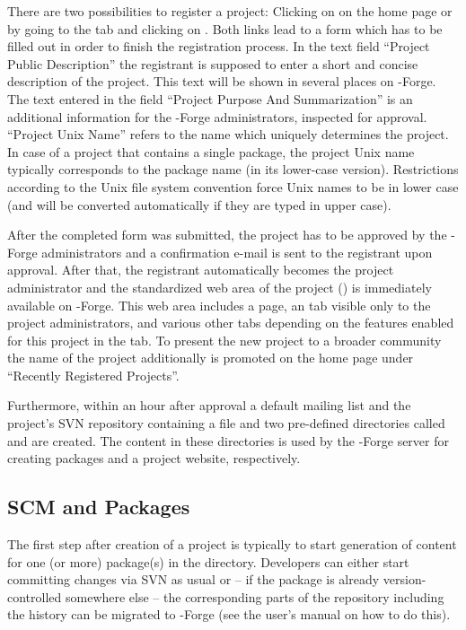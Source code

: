 There are two possibilities to register a project: Clicking on
 on the home page or by going to the  tab and clicking on . Both links lead to a
form which has to be filled out in order to finish the registration
process. In the text field ``Project Public Description'' the
registrant is supposed to enter a short and concise description of the
project. This text will be shown in several places on \R{}-Forge. The text
entered in the field ``Project Purpose And Summarization'' is an
additional information for the \R{}-Forge administrators, inspected
for approval. ``Project Unix
Name'' refers to the name which 
uniquely determines the project. In case of a project that contains a
single \R{} package, the project Unix name typically corresponds to
the package name (in its lower-case version). Restrictions according to
the Unix file system convention force Unix names to be in lower case
(and will be converted automatically if they are typed in upper case).

After the completed form was submitted, the project has to be approved
by the \R{}-Forge administrators and a confirmation e-mail is sent to the
registrant upon approval. After that, the registrant automatically
becomes the project administrator and the standardized web area of the
project () is
immediately available on \R{}-Forge. 
This web area includes a  page, an  tab
visible only to the project administrators, and various other tabs
depending on the features enabled for this project in the 
tab. To present the new project to a broader community the name of the
project additionally is promoted on the home page under ``Recently
Registered Projects''.

Furthermore, within an hour after approval a default mailing list and
the project's SVN repository containing a  file and two
pre-defined directories called  and  are created. 
The content in these directories is used by the \R{}-Forge server
for creating \R{} packages and a project website, respectively.


\subsection{SCM and \R{} Packages}

The first step after creation of a project is typically to start
generation of content for one (or more) \R{} package(s) in the 
directory. Developers can either start committing changes via SVN as usual
or -- if the package is already version-controlled somewhere else --
the corresponding parts of the repository including the history can be
migrated to \R{}-Forge (see the user's manual on how to do this).

